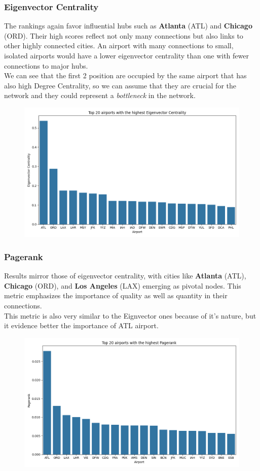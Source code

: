 \documentclass[12pt]{article}
\begin{document}
    \subsubsection{Eigenvector Centrality}
    The rankings again favor influential hubs such as \textbf{Atlanta} (ATL) and \textbf{Chicago} (ORD). Their high scores reflect not only many connections but also links to other highly connected cities. An airport with many connections to small, isolated airports would have a lower eigenvector centrality than one with fewer connections to major hubs.\\
    We can see that the first 2 position are occupied by the same airport that has also high Degree Centrality, so we can assume that they are crucial for the network and they could represent a \textit{bottleneck} in the network.\\    

    \begin{figure}[H]
        \centering
        \includegraphics[width=0.8\linewidth]{img/eigenvector_centrality}
    \end{figure}

    \subsubsection{Pagerank}
    Results mirror those of eigenvector centrality, with cities like \textbf{Atlanta} (ATL), \textbf{Chicago} (ORD), and \textbf{Los Angeles} (LAX) emerging as pivotal nodes. This metric emphasizes the importance of quality as well as quantity in their connections.\\
    This metric is also very similar to the Eignvector ones because of it's nature, but it evidence better the importance of ATL airport.
    
    \begin{figure}[H]
        \centering
        \includegraphics[width=0.8\linewidth]{img/pagerank}
    \end{figure}
\end{document}
